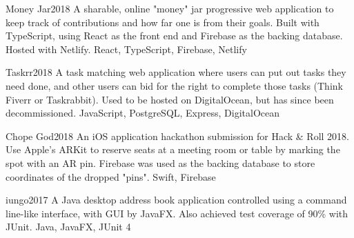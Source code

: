 %
%
%


\begin{projects}
	\project
	{Money Jar}{2018}
	{  }
	{A sharable, online "money" jar progressive web application to keep track of contributions and how far one is from their goals. Built with TypeScript, using React as the front end and Firebase as the backing database. Hosted with Netlify.}
	{React, TypeScript, Firebase, Netlify}

	\project
	{Taskrr}{2018}
	{}
	{A task matching web application where users can put out tasks they need done, and other users can bid for the right to complete those tasks (Think Fiverr or Taskrabbit). Used to be hosted on DigitalOcean, but has since been decommissioned.}
	{JavaScript, PostgreSQL, Express, DigitalOcean}

	\project
	{Chope God}{2018}
	{}
	{An iOS application hackathon submission for Hack \& Roll 2018. Use Apple’s ARKit to reserve seats at a meeting room or table by marking the spot with an AR pin.  Firebase was used as the backing database to store coordinates of the dropped "pins".}
	{Swift, Firebase}

	\project
	{iungo}{2017}
	{}
	{A Java desktop address book application controlled using a command line-like interface, with GUI by JavaFX. Also achieved test coverage of 90\% with JUnit.}
	{Java, JavaFX, JUnit 4}

\end{projects}
